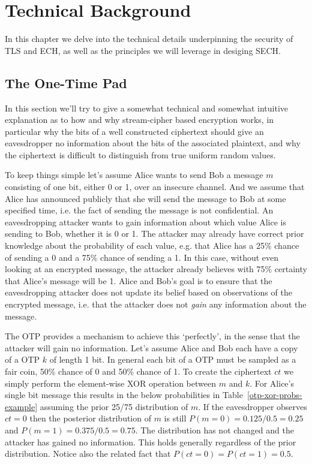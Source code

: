 \chapter{Technical Background}
In this chapter we delve into the technical details underpinning
the security of \ac{TLS} and \ac{ECH},
as well as the principles we will leverage in desiging \ac{SECH}.

\section{The One-Time Pad}
In this section we'll try to give a somewhat technical and somewhat intuitive explanation as to how and why stream-cipher based encryption works,
in particular why the bits of a well constructed ciphertext should give an eavesdropper no information about the bits of the associated plaintext,
and why the ciphertext is
difficult to distinguish from true
uniform random values.

To keep things simple let's assume Alice wants to send Bob a message $m$ consisting of one bit, either 0 or 1, over an insecure channel.
And we assume that Alice has announced publicly that she will send the message to Bob
at some specified time, i.e. the fact of sending the message is not confidential.
An eavesdropping attacker wants to gain information about which value Alice is sending to Bob, whether it is 0 or 1.
The attacker may already have correct prior knowledge about the probability of each value,
e.g. that Alice has a 25\% chance of sending a 0 and a 75\% chance of sending a 1.
In this case, without even looking at an encrypted message, the attacker already believes with 75\% certainty that Alice's message will be 1.
Alice and Bob's goal is to ensure that the eavesdropping attacker does not update its belief based on observations of the encrypted message,
i.e. that the attacker does not {\em gain} any information about the message.

The \ac{OTP} provides a mechanism to achieve this `perfectly', in the sense that
the attacker will gain no information.
Let's assume Alice and Bob each have a copy of a \ac{OTP} $k$ of length 1 bit.
In general each bit of a \ac{OTP} must be sampled as a fair coin, 50\% chance of 0 and 50\% chance of 1.
To create the ciphertext $ct$ we simply perform the element-wise \ac{XOR} operation between $m$ and $k$.
For Alice's single bit message this results in the below probabilities in Table~\ref{otp-xor-probs-example} assuming the prior 25/75 distribution of $m$.
If the eavesdropper observes $ct=0$ then the posterior distribution of $m$ is still $P(m=0)=0.125/0.5=0.25$ and $P(m=1)=0.375/0.5=0.75$.
The distribution has not changed and the attacker has gained no information.
This holds generally regardless of the prior distribution.
Notice also the related fact that $P(ct=0)=P(ct=1)=0.5$.

